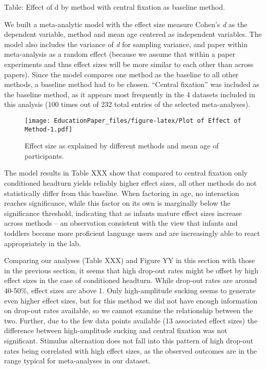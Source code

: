 \documentclass[english,floatsintext,man]{apa6}
\begin{document}
Table: Effect of d by method with central fixation as baseline method.

We built a meta-analytic model with the effect size measure Cohen's
\emph{d} as the dependent variable, method and mean age centered as
independent variables. The model also includes the variance of \emph{d}
for sampling variance, and paper within meta-analysis as a random effect
(because we assume that within a paper experiments and thus effect sizes
will be more similar to each other than across papers). Since the model
compares one method as the baseline to all other methods, a baseline
method had to be chosen. \enquote{Central fixation} was included as the
baseline method, as it appears most frequently in the 4 datasets
included in this analysis (100 times out of 232 total entries of the
selected meta-analyses).

\begin{figure}[htbp]
\centering
\texttt{[image: EducationPaper\_files/figure-latex/Plot of Effect of Method-1.pdf]}
\caption{Effect size as explained by different methods and mean age of
participants.}
\end{figure}

The model results in Table XXX show that compared to central fixation
only conditioned headturn yields reliably higher effect sizes, all other
methods do not statistically differ from this baseline. When factoring
in age, no interaction reaches significance, while this factor on its
own is marginally below the significance threshold, indicating that as
infants mature effect sizes increase across methods -- an observation
consistent with the view that infants and toddlers become more
proficient language users and are increasingly able to react
appropriately in the lab.

Comparing our analyses (Table XXX) and Figure YY in this section with
those in the previous section, it seems that high drop-out rates might
be offset by high effect sizes in the case of conditioned headturn.
While drop-out rates are around 40-50\%, effect sizes are above 1. Only
high-amplitude sucking seems to generate even higher effect sizes, but
for this method we did not have enough information on drop-out rates
available, so we cannot examine the relationship between the two.
Further, due to the few data points available (13 associated effect
sizes) the difference between high-amplitude sucking and central
fixation was not significant. Stimulus alternation does not fall into
this pattern of high drop-out rates being correlated with high effect
sizes, as the observed outcomes are in the range typical for
meta-analyses in our dataset.
\end{document}
